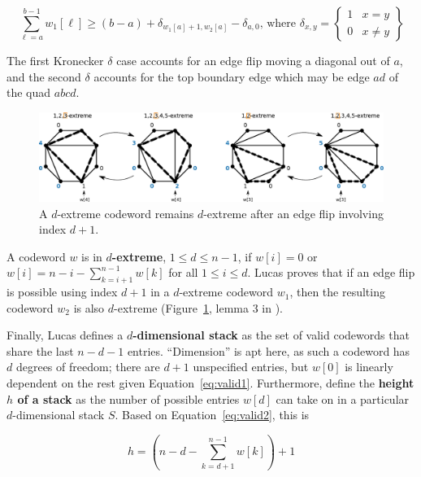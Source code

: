 \documentclass[english]{socg-lipics-v2021}
\begin{document}
\begin{equation}
    \label{eq:rot3}
    \sum_{\ell = a}^{b-1} w_1[\ell] \geq (b - a) + \delta_{w_1[a]+1, w_2[a]} - \delta_{a,0} \text{,  where }  \delta_{x,y} = \left\{ \begin{array}{cc} 1 & x = y \\ 0 & x \neq y \end{array} \right\}
\end{equation}

The first Kronecker $\delta$ case accounts for an edge flip moving a diagonal out of $a$, and the second $\delta$ accounts for the top boundary edge which may be edge $ad$ of the quad $abcd$.

\begin{figure}
    \centering
    \includegraphics[width=\textwidth]{Extreme.pdf}
    \caption{A $d$-extreme codeword remains $d$-extreme after an edge flip involving index $d+1$.}
    \label{fig:extreme}
\end{figure}

A codeword $w$ is in {\bf $d$-extreme}, $1 \leq d \leq n-1$, if $w[i] = 0$ or $w[i] = n-i-\sum_{k=i+1}^{n-1} w[k]$ for all $1 \leq i \leq d$.  Lucas proves that if an edge flip is possible using index $d+1$ in a $d$-extreme codeword $w_1$, then the resulting codeword $w_2$ is also $d$-extreme (Figure~\ref{fig:extreme}, lemma 3 in \cite{lucas1987rotation}).


Finally, Lucas defines a {\bf $d$-dimensional stack} as the set of valid codewords that share the last $n-d-1$ entries.  ``Dimension'' is apt here, as such a codeword has $d$ degrees of freedom; there are $d+1$ unspecified entries, but $w[0]$ is linearly dependent on the rest given Equation~\ref{eq:valid1}.  Furthermore, define the {\bf height $h$ of a stack} as the number of possible entries $w[d]$ can take on in a particular $d$-dimensional stack $S$.  Based on Equation~\ref{eq:valid2}, this is

\begin{equation}
    h = \left(n-d-\sum_{k=d+1}^{n-1} w[k]\right) + 1
\end{equation}
\end{document}
